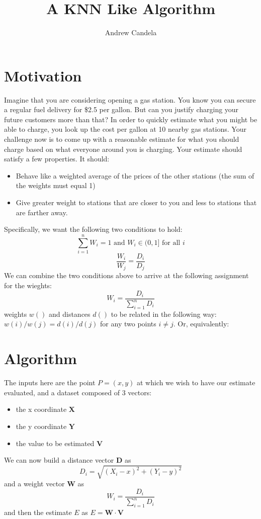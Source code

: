 \documentclass[11pt, oneside]{article}   	%
\title{A KNN Like Algorithm}
\author{Andrew Candela}
\begin{document}
\maketitle
\section*{Motivation}Imagine that you are considering opening a gas station. You know you can secure a regular fuel delivery for \$2.5 per gallon. But can you justify charging your future customers more than that? In order to quickly estimate what you might be able to charge, you look up the cost per gallon at 10 nearby gas stations. Your challenge now is to come up with a reasonable estimate for what you should charge based on what everyone around you is charging.
Your estimate should satisfy a few properties. It should:
\begin{itemize}
\item{Behave like a weighted average of the prices of the other stations (the sum of the weights must equal 1)}
\item{Give greater weight to stations that are closer to you and less to stations that are farther away.}
\end{itemize}
Specifically, we want the following two conditions to hold:
\begin{equation}
\sum_{i=1}^n W_i = 1 \text{ and } W_i \in (0,1] \text{ for all } i
\end{equation}
\begin{equation}
\frac{W_i}{W_j}=\frac{D_i}{D_j}
\end{equation}
We can combine the two conditions above to arrive at the following assignment for the wieghts:\[W_i=\frac{D_i}{\sum_{i=1}^{n}D_i}\]
weights $w()$ and distances $d()$ to be related in the following way: $w(i)/w(j) = d(i)/d(j)$ for any two points $i \neq j$. Or, equivalently: \[\]


\section*{Algorithm}
The inputs here are the point $P=(x,y)$ at which we wish to have our estimate evaluated, and a dataset composed of 3 vectors: 
\begin{itemize}
\item{the x coordinate $\bm{X}$} 
\item{the y coordinate $\bm{Y}$} 
\item{the value to be estimated $\bm{V}$}
\end{itemize}
We can now build a distance vector $\bm{D}$ as 
\[
D_i=\sqrt{(X_i - x)^2+(Y_i - y)^2}
\]
and a weight vector $\bm{W}$ as 
\[W_i = \frac{D_i}{\sum_{i=1}^{n}D_i}\]
and then the estimate $E$ as $E = \bm{W} \cdot \bm{V}$
\end{document}
